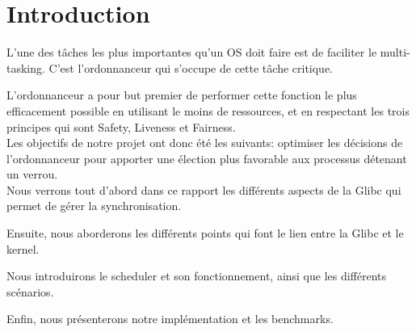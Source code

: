 \section*{Introduction}
	L'une des tâches les plus importantes qu'un OS doit faire est de faciliter le
	multi-tasking.
	C'est l'ordonnanceur qui s'occupe de cette tâche critique.
	
	L'ordonnanceur a pour but premier de performer cette fonction le plus
	efficacement possible en utilisant le moins de ressources, et en respectant les
	trois principes qui sont Safety, Liveness et Fairness.
	\\
	
	Les objectifs de notre projet ont donc été les suivants: optimiser les
	décisions de l'ordonnanceur pour apporter une élection plus favorable aux
	processus détenant un verrou.
	\\
	
	Nous verrons tout d'abord dans ce rapport les différents aspects de la Glibc
	qui permet de gérer la synchronisation. 
	
	Ensuite, nous aborderons les différents points qui font le lien entre la Glibc
	et le kernel. 
	
	Nous introduirons le scheduler et son fonctionnement, ainsi que les différents
	scénarios.
	
	Enfin, nous présenterons notre implémentation et les benchmarks.